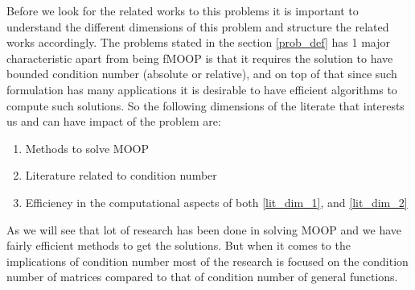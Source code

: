 \hspace{1cm}Before we look for the related works to this problems it is important to understand the different dimensions of this problem and structure the related works accordingly. The problems stated in the section \ref{prob_def} has 1 major characteristic apart from being fMOOP is that it requires the solution to have bounded condition number (absolute or relative), and on top of that since such formulation has many applications it is desirable to have efficient algorithms to compute such solutions. So the following dimensions of the literate that interests us and can have impact of the problem are:
\begin{enumerate}
    \item Methods to solve MOOP \label{lit_dim_1}
    \item Literature related to condition number \label{lit_dim_2}
    \item Efficiency in the computational aspects of both \ref{lit_dim_1}, and \ref{lit_dim_2}
\end{enumerate}
As we will see that lot of research has been done in solving MOOP and we have fairly efficient methods to get the solutions. But when it comes to the implications of condition number most of the research is focused on the condition number of matrices compared to that of condition number of general functions.


